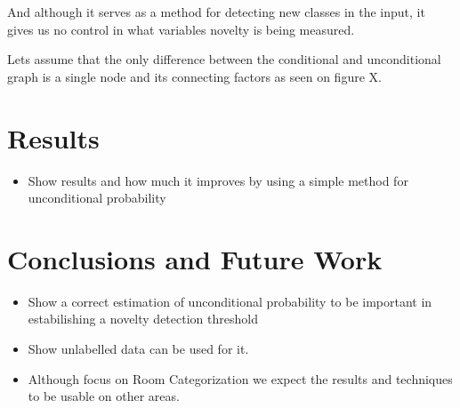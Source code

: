 \documentclass[runningheads,a4paper]{llncs}
\begin{document}
And although it serves as a method for detecting new classes in the input, it gives us no control in what
variables novelty is being measured.

Lets assume that the only difference between the conditional and unconditional graph is a single node and its connecting factors
as seen on figure X.

\section{Results}
\begin{itemize}
\item Show results and how much it improves by using a simple method for unconditional probability
\end{itemize}

\section{Conclusions and Future Work}
\begin{itemize}
\item Show a correct estimation of unconditional probability to be important in estabilishing a novelty detection threshold
\item Show unlabelled data can be used for it.
\item Although focus on Room Categorization we expect the results and techniques to be usable on other areas.
\end{itemize}



\end{document}
